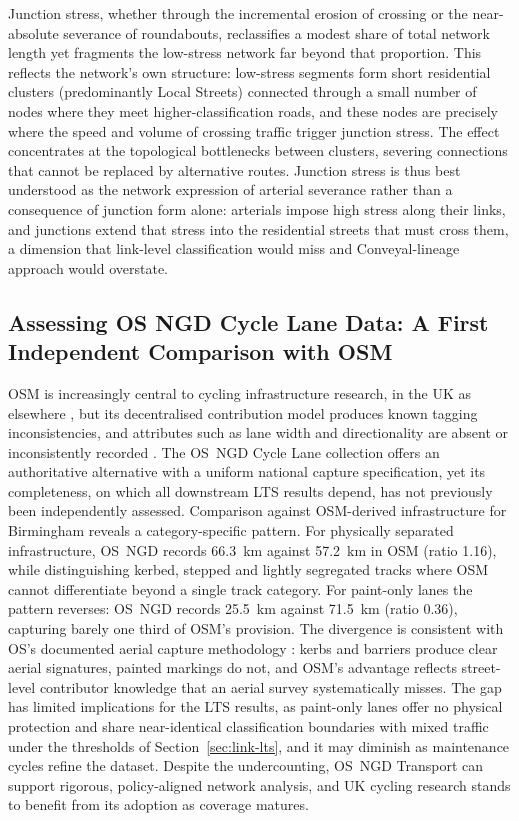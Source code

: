 \documentclass[final,5p,times,twocolumn,authoryear]{elsarticle}
\begin{document}
Junction stress, whether through the incremental erosion of crossing or the
near-absolute severance of roundabouts, reclassifies a modest share of total
network length yet fragments the low-stress network far beyond that proportion.
This reflects the network's own structure: low-stress segments form short
residential clusters (predominantly Local Streets) connected through a small
number of nodes where they meet higher-classification roads, and these nodes are
precisely where the speed and volume of crossing traffic trigger junction
stress. The effect concentrates at the topological bottlenecks between clusters,
severing connections that cannot be replaced by alternative routes. Junction
stress is thus best understood as the network expression of arterial severance
rather than a consequence of junction form alone: arterials impose high stress
along their links, and junctions extend that stress into the residential streets
that must cross them, a dimension that link-level classification would miss and
Conveyal-lineage approach would overstate.

\subsection{Assessing OS NGD Cycle Lane Data: A First Independent Comparison with OSM}
\label{sec:disc-osngd}

OSM is increasingly central to cycling infrastructure research, in the UK as elsewhere \citep{ferster2020, lovelace2020, nelson2021}, but its decentralised contribution model produces known tagging inconsistencies, and attributes such as lane width and directionality are absent or inconsistently recorded \citep{wasserman2019, lukawska2026}. The OS~NGD Cycle Lane collection offers an authoritative alternative with a uniform national capture specification, yet its completeness, on which all downstream LTS results depend, has not previously been independently assessed. Comparison against OSM-derived infrastructure for Birmingham reveals a category-specific pattern. For physically separated infrastructure, OS~NGD records 66.3~km against 57.2~km in OSM (ratio 1.16), while distinguishing kerbed, stepped and lightly segregated tracks where OSM cannot differentiate beyond a single track category. For paint-only lanes the pattern reverses: OS~NGD records 25.5~km against 71.5~km (ratio 0.36), capturing barely one third of OSM's provision. The divergence is consistent with OS's documented aerial capture methodology \citep{ordnancesurvey2025}: kerbs and barriers produce clear aerial signatures, painted markings do not, and OSM's advantage reflects street-level contributor knowledge that an aerial survey systematically misses. The gap has limited implications for the LTS results, as paint-only lanes offer no physical protection and share near-identical classification boundaries with mixed traffic under the thresholds of Section~\ref{sec:link-lts}, and it may diminish as maintenance cycles refine the dataset. Despite the undercounting, OS~NGD Transport can support rigorous, policy-aligned network analysis, and UK cycling research stands to benefit from its adoption as coverage matures.
\end{document}
